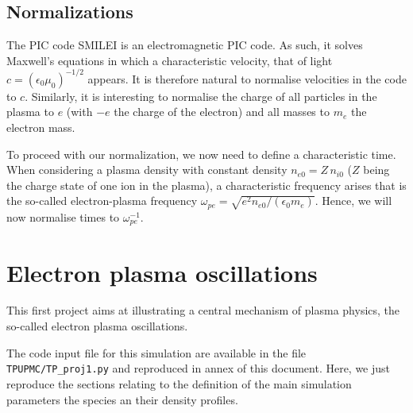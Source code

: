 \documentclass[11pt,a4paper]{article}
\begin{document}
\subsection*{Normalizations}

The PIC code SMILEI is an electromagnetic PIC code. As such, it solves Maxwell's equations in which a characteristic velocity, that of light $c = (\epsilon_0 \mu_0)^{-1/2}$ appears. It is therefore natural to normalise velocities in the code to $c$. Similarly, it is interesting to normalise the charge of all particles in the plasma to $e$ (with $-e$ the charge of the electron) and all masses to $m_e$ the electron mass.

To proceed with our normalization, we now need to define a characteristic time. When considering a plasma density with constant density $n_{e0} = Z\,n_{i0}$ ($Z$ being the charge state of one ion in the plasma), a characteristic frequency arises that is the so-called electron-plasma frequency $\omega_{pe} = \sqrt{e^2 n_{e0}/(\epsilon_0 m_e)}$. Hence, we will now normalise times to $\omega_{pe}^{-1}$.

\begin{ExerciseList}
\vspace{0.5cm}
  \Exercise[title={Normalizations},label={ex1}] \leavevmode

\end{ExerciseList}


\newpage
\section{Electron plasma oscillations}\label{proj1}

This first project aims at illustrating a central mechanism of plasma physics, the so-called electron plasma oscillations.

The code input file for this simulation are available in the file \texttt{TPUPMC/TP\_proj1.py} and reproduced in annex of this document.
Here, we just reproduce the sections relating to the definition of the main simulation parameters the species an their density profiles.
\end{document}
